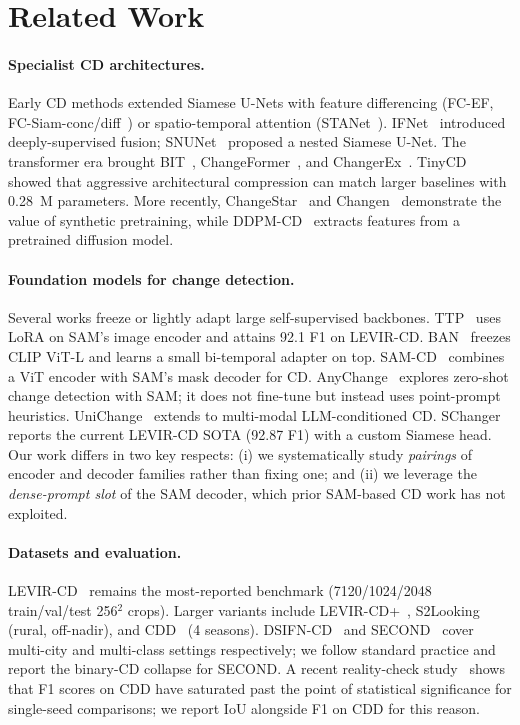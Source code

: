 \section{Related Work}
\label{sec:related}

\paragraph{Specialist CD architectures.}
Early CD methods extended Siamese U-Nets with feature differencing
(FC-EF, FC-Siam-conc/diff~\citep{daudt2018fully}) or spatio-temporal attention
(STANet~\citep{chen2020spatial}). IFNet~\citep{zhang2020deeply} introduced
deeply-supervised fusion; SNUNet~\citep{fang2021snunet} proposed a nested
Siamese U-Net. The transformer era brought BIT~\citep{chen2021remote},
ChangeFormer~\citep{bandara2022changeformer}, and
ChangerEx~\citep{fang2023changer}. TinyCD~\citep{codegoni2023tinycd} showed
that aggressive architectural compression can match larger baselines with
0.28~M parameters. More recently, ChangeStar~\citep{zheng2022changestar} and
Changen~\citep{zheng2023changen} demonstrate the value of synthetic
pretraining, while DDPM-CD~\citep{bandara2024ddpmcd} extracts features from a
pretrained diffusion model.

\paragraph{Foundation models for change detection.}
Several works freeze or lightly adapt large self-supervised backbones.
TTP~\citep{chen2024ttp} uses LoRA on SAM's image encoder and attains 92.1 F1
on LEVIR-CD. BAN~\citep{li2024ban} freezes CLIP ViT-L and learns a small
bi-temporal adapter on top. SAM-CD~\citep{dingsamcd} combines a ViT encoder
with SAM's mask decoder for CD. AnyChange~\citep{zheng2024segment} explores
zero-shot change detection with SAM; it does not fine-tune but instead uses
point-prompt heuristics. UniChange~\citep{zeng2025unichange} extends to
multi-modal LLM-conditioned CD. SChanger~\citep{sun2025schanger} reports the
current LEVIR-CD SOTA (92.87 F1) with a custom Siamese head.
Our work differs in two key respects: (i) we systematically study
\emph{pairings} of encoder and decoder families rather than fixing one; and
(ii) we leverage the \emph{dense-prompt slot} of the SAM decoder, which prior
SAM-based CD work has not exploited.

\paragraph{Datasets and evaluation.}
LEVIR-CD~\citep{chen2020spatial} remains the most-reported benchmark
(7120/1024/2048 train/val/test 256$^2$ crops). Larger variants include
LEVIR-CD+~\citep{zheng2022changestar}, S2Looking~\citep{shen2021s2looking}
(rural, off-nadir), and CDD~\citep{lebedev2018change} (4 seasons).
DSIFN-CD~\citep{zhang2020deeply} and SECOND~\citep{yang2021second} cover
multi-city and multi-class settings respectively; we follow standard practice
and report the binary-CD collapse for SECOND. A recent reality-check
study~\citep{corley2024reality} shows that F1 scores on CDD have saturated
past the point of statistical significance for single-seed comparisons; we
report IoU alongside F1 on CDD for this reason.
